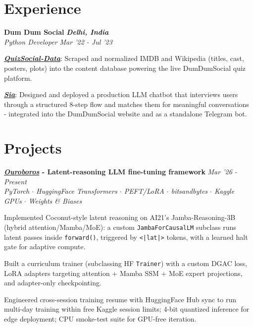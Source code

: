\documentclass[10pt,letterpaper]{article}
\newcommand{\entryheader}[3]{%
    \textbf{#1} \hfill \textit{#2}\\[0pt]
    \textit{\small #3}\\[1pt]
}
\begin{document}
\section*{Experience}
\entryheader{Dum Dum Social}{\bf{Delhi, India}}{Python Developer \hfill Mar '22 - Jul '23}
\vspace{-10pt}
{\begin{tightitemize}
    \item \textbf{\href{https://github.com/deveshpat/QuizSocial-Data}{\textit{QuizSocial-Data}}}: Scraped and normalized IMDB and Wikipedia (titles, cast, posters, plots) into the content database powering the live DumDumSocial quiz platform.
    
    \item \textbf{\href{https://github.com/deveshpat/Telegram_bot}{\textit{Sia}}}: Designed and deployed a production LLM chatbot that interviews users through a structured 8-step flow and matches them for meaningful conversations - integrated into the DumDumSocial website and as a standalone Telegram bot.
\end{tightitemize}}


\section*{Projects}

\entryheader{\href{https://github.com/deveshpat/Ouroboros}{\textit{Ouroboros}} - Latent-reasoning LLM fine-tuning framework}
{Mar '26 - Present}
{\textit{\small PyTorch $\cdot$ HuggingFace Transformers $\cdot$ PEFT/LoRA $\cdot$ bitsandbytes $\cdot$ Kaggle GPUs $\cdot$ Weights \& Biases}}{}
\vspace{-10pt}
\begin{tightitemize}
    \item Implemented Coconut-style latent reasoning on AI21's Jamba-Reasoning-3B (hybrid attention/Mamba/MoE): a custom \texttt{JambaForCausalLM} subclass runs latent passes inside \texttt{forward()}, triggered by \texttt{<|lat|>} tokens, with a learned halt gate for adaptive compute.
    \item Built a curriculum trainer (subclassing HF \texttt{Trainer}) with a custom DGAC loss, LoRA adapters targeting attention + Mamba SSM + MoE expert projections, and adapter-only checkpointing.
    \item Engineered cross-session training resume with HuggingFace Hub sync to run multi-day training within free Kaggle session limits; 4-bit quantized inference for edge deployment; CPU smoke-test suite for GPU-free iteration.
\end{tightitemize}
\end{document}
